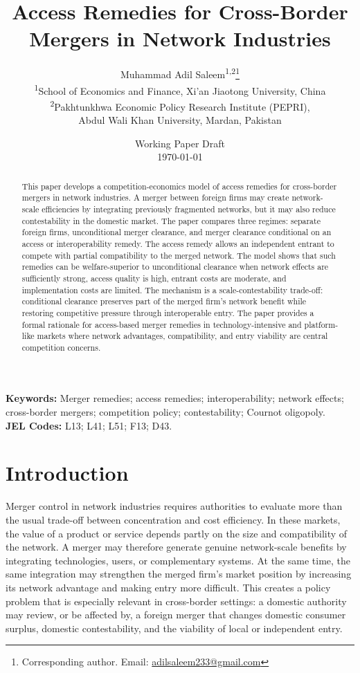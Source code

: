 \documentclass[12pt]{article}
\title{Access Remedies for Cross-Border Mergers in Network Industries}
\author{Muhammad Adil Saleem\textsuperscript{1,2}\thanks{Corresponding author. Email: \href{mailto:adilsaleem233@gmail.com}{adilsaleem233@gmail.com}}\\[4pt]
\small \textsuperscript{1}School of Economics and Finance, Xi'an Jiaotong University, China\\[2pt]
\small \textsuperscript{2}Pakhtunkhwa Economic Policy Research Institute (PEPRI),\\
\small Abdul Wali Khan University, Mardan, Pakistan}
\date{Working Paper Draft\\\today}
\begin{document}
\maketitle

\begin{abstract}
This paper develops a competition-economics model of access remedies for cross-border mergers in network industries. A merger between foreign firms may create network-scale efficiencies by integrating previously fragmented networks, but it may also reduce contestability in the domestic market. The paper compares three regimes: separate foreign firms, unconditional merger clearance, and merger clearance conditional on an access or interoperability remedy. The access remedy allows an independent entrant to compete with partial compatibility to the merged network. The model shows that such remedies can be welfare-superior to unconditional clearance when network effects are sufficiently strong, access quality is high, entrant costs are moderate, and implementation costs are limited. The mechanism is a scale-contestability trade-off: conditional clearance preserves part of the merged firm's network benefit while restoring competitive pressure through interoperable entry. The paper provides a formal rationale for access-based merger remedies in technology-intensive and platform-like markets where network advantages, compatibility, and entry viability are central competition concerns.
\end{abstract}

\noindent\textbf{Keywords:} Merger remedies; access remedies; interoperability; network effects; cross-border mergers; competition policy; contestability; Cournot oligopoly.\\
\textbf{JEL Codes:} L13; L41; L51; F13; D43.

\section{Introduction}

Merger control in network industries requires authorities to evaluate more than the usual trade-off between concentration and cost efficiency. In these markets, the value of a product or service depends partly on the size and compatibility of the network. A merger may therefore generate genuine network-scale benefits by integrating technologies, users, or complementary systems. At the same time, the same integration may strengthen the merged firm's market position by increasing its network advantage and making entry more difficult. This creates a policy problem that is especially relevant in cross-border settings: a domestic authority may review, or be affected by, a foreign merger that changes domestic consumer surplus, domestic contestability, and the viability of local or independent entry.
\end{document}
